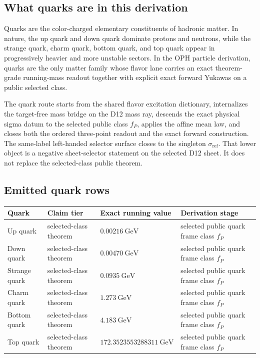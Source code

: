 \documentclass[11pt]{article}
\begin{document}
\subsection{What quarks are in this derivation}

Quarks are the color-charged elementary constituents of hadronic matter. In nature, the up quark
and down quark dominate protons and neutrons, while the strange quark, charm quark, bottom
quark, and top quark appear in progressively heavier and more unstable sectors. In the OPH
particle derivation, quarks are the only matter family whose flavor lane carries an exact
theorem-grade running-mass readout together with explicit exact forward Yukawas on a public
selected class.

The quark route starts from the shared flavor excitation dictionary, internalizes the target-free
mass bridge on the D12 mass ray, descends the exact physical sigma datum to the selected public
class \(f_P\), applies the affine mean law, and closes both the ordered three-point readout and
the exact forward construction. The same-label left-handed selector surface closes to
the singleton \(\sigma_{\mathrm{ref}}\). That lower object is a negative sheet-selector statement
on the selected D12 sheet. It does not replace the selected-class public theorem.

\subsection{Emitted quark rows}

\begin{table}[h]
\centering
\small
\begin{tabular}{@{}llll@{}}
\toprule
Quark & Claim tier & Exact running value & Derivation stage \\
\midrule
Up quark & selected-class theorem & \(0.00216~\mathrm{GeV}\) & selected public quark frame class \(f_P\) \\
Down quark & selected-class theorem & \(0.00470~\mathrm{GeV}\) & selected public quark frame class \(f_P\) \\
Strange quark & selected-class theorem & \(0.0935~\mathrm{GeV}\) & selected public quark frame class \(f_P\) \\
Charm quark & selected-class theorem & \(1.273~\mathrm{GeV}\) & selected public quark frame class \(f_P\) \\
Bottom quark & selected-class theorem & \(4.183~\mathrm{GeV}\) & selected public quark frame class \(f_P\) \\
Top quark & selected-class theorem & \(172.3523553288311~\mathrm{GeV}\) & selected public quark frame class \(f_P\) \\
\bottomrule
\end{tabular}
\end{table}
\end{document}

